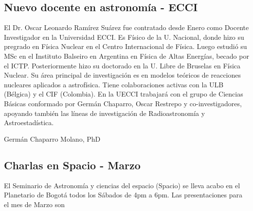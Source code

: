 \documentclass{book}
\begin{document}
\subsection{Nuevo docente en astronomía - ECCI}

El Dr. Oscar Leonardo Ramírez Suárez fue contratado desde Enero como Docente Investigador en la Universidad ECCI. Es Físico de la U. Nacional, donde hizo su pregrado en Física Nuclear en el Centro Internacional de Física. Luego estudió su MSc en el Instituto Balseiro en Argentina en Física de Altas Energías, becado por el ICTP. Posteriormente hizo su doctorado en la U. Libre de Bruselas en Física Nuclear. Su área principal de investigación es en modelos teóricos de reacciones nucleares aplicados a astrofísica. Tiene colaboraciones activas con la ULB (Bélgica) y el CIF (Colombia). En la UECCI trabajará con el grupo de Ciencias Básicas conformado por Germán Chaparro, Oscar Restrepo y co-investigadores, apoyando también las líneas de investigación de Radioastronomía y Astroestadística.

\begin{flushright}
Germán Chaparro Molano, PhD
\end{flushright}


\subsection{Charlas en Spacio - Marzo}
El Seminario de Astronomía y ciencias del espacio (Spacio) se lleva acabo en el Planetario de Bogotá todos los Sábados de 4pm a 6pm. Las presentaciones para el mes de Marzo son 
\end{document}
